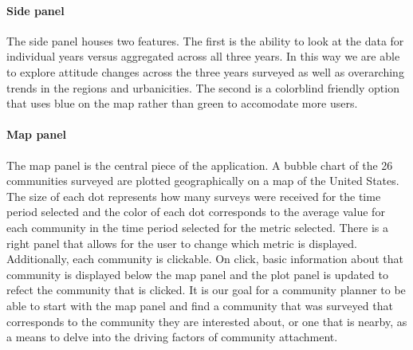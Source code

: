 \documentclass[11pt]{article}\usepackage{knitr}
\begin{document}
\paragraph{Side panel} The side panel houses two features. The first is the ability to look at the data for individual years versus aggregated across all three years. In this way we are able to explore attitude changes across the three years surveyed as well as overarching trends in the regions and urbanicities. The second is a colorblind friendly option that uses blue on the map rather than green to accomodate more users.

\paragraph{Map panel} The map panel is the central piece of the application. A bubble chart of the 26 communities surveyed are plotted geographically on a map of the United States. The size of each dot represents how many surveys were received for the time period selected and the color of each dot corresponds to the average value for each community in the time period selected for the metric selected. There is a right panel that allows for the user to change which metric is displayed. Additionally, each community is clickable. On click, basic information about that community is displayed below the map panel and the plot panel is updated to refect the community that is clicked. It is our goal for a community planner to be able to start with the map panel and find a community that was surveyed that corresponds to the community they are interested about, or one that is nearby, as a means to delve into the driving factors of community attachment.
\end{document}
